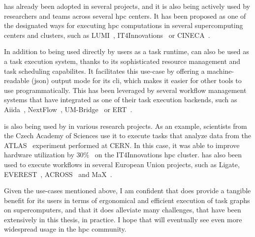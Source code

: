 \hyperqueue{} has already been adopted in several projects, and it is also being actively
used by researchers and teams across several \gls{hpc} centers. It has been proposed
as one of the designated ways for executing \gls{hpc} computations in several
supercomputing centers and clusters, such as LUMI~\cite{it4i-lumi},
IT4Innovations~\cite{it4i-hq} or CINECA~\cite{cineca}.

In addition to being used directly by users as a task runtime, \hyperqueue{} can also be
used as a task execution system, thanks to its sophisticated resource management and task
scheduling capabilites. It facilitates this use-case by offering a machine-readable
(\gls{json}) output mode for its \gls{cli}, which makes it easier for
other tools to use \hyperqueue{} programmatically. This has been leveraged by several
workflow management systems that have integrated \hyperqueue{} as one of their task
execution backends, such as Aiida~\cite{aiida-hq}, NextFlow~\cite{nextflow-hq},
UM-Bridge~\cite{umbridge} or ERT~\cite{ert}.

\hyperqueue{} is also being used by in various research projects. As an example,
scientists from the Czech Academy of Sciences use it to execute tasks that analyze data from the
ATLAS~\cite{atlas} experiment performed at CERN. In this case, it was able to improve
hardware utilization by 30\%~\cite{cern-hq} on the IT4Innovations \gls{hpc}
cluster. \hyperqueue{} has also been used to execute workflows in several European Union
projects, such as Ligate\cite{ligate}, EVEREST~\cite{everest},
ACROSS~\cite{across} and MaX~\cite{max}.

Given the use-cases mentioned above, I am confident that \hyperqueue{} does provide a
tangible benefit for its users in terms of ergonomical and efficient execution of task graphs on
supercomputers, and that it does alleviate many challenges, that have been extensively in this
thesis, in practice. I hope that \hyperqueue{} will eventually see even more widespread
usage in the \gls{hpc} community.
